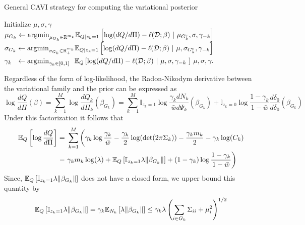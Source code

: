 \documentclass[12pt]{article}
\begin{document}
\begin{algorithm}[htp]
    \caption{General CAVI strategy for computing the variational posterior}
    \label{alg:cavi_gsvb}
    \begin{algorithmic}[0]
	\vspace{.3em}
	\State Initialize $ \mu, \sigma, \gamma $
	\NoDo {} \NoDo
	    \NoDo {}
	    \State $ \mu_{G_k} \leftarrow {\argmin}_{\mu_{G_k} \in \R^{m_k}} \E_{Q | z_k = 1} \left[ \log (dQ/d\Pi) - \ell(\D; \beta) \ | \ \mu_{G_k^c}, \sigma, \gamma_{-k} \right]$
	    \State $ \sigma_{G_k} \leftarrow {{\arg\!\min}}_{\sigma_{G_k} \in \mathbb{R}^{m_k}_+} \mathbb{E}_{Q | z_k = 1} \left[ \log (dQ/d\Pi) - \ell(\mathcal{D}; \beta) \ | \ \mu, \sigma_{G_k^c}, \gamma_{-k} \right]$
	    \State $ \gamma_{k}\ \  \leftarrow {{\arg\!\min}}_{\gamma_{k} \in [0, 1]}\ \ \mathbb{E}_Q \left[ \log (dQ/d\Pi) - \ell(\mathcal{D}; \beta)\  | \ \mu, \sigma, \gamma_{-k} \ \right]$
	    \EndFor
	\EndWhile
	\State \Return $ \mu, \sigma, \gamma $.
    \end{algorithmic}
\end{algorithm}

Regardless of the form of log-likelihood, the Radon-Nikodym derivative between the variational family and the prior can be expressed as
$$
\log \frac{dQ}{d\Pi}(\beta) = \sum_{k=1}^M \log \frac{d Q_k}{d\Pi_k} (\beta_{G_k}) 
= \sum_{k=1}^M \mathbb{I}_{z_k = 1} \log \frac{\gamma_k dN_k}{\bar{w} d \Psi_k}(\beta_{G_k})
+ \mathbb{I}_{z_k = 0} \log \frac{1-\gamma_k}{1 - \bar{w}} \frac{d \delta_0}{d \delta_0} (\beta_{G_k})
$$
Under this factorization it follows that
\begin{equation}
\begin{aligned}
\mathbb{E}_{Q} \left[ \log \frac{d Q}{d \Pi} \right] = &\
    \sum_{k=1}^M 
\bigg(
    \gamma_k \log \frac{\gamma_k}{\bar{w}}
-
    \frac{\gamma_k}{2} \log( \det (2 \pi \Sigma_k))
-
    \frac{\gamma_k m_k}{2}
- 
    \gamma_k \log(C_k) \\
- &\
    \gamma_k m_k \log (\lambda)
+
    \mathbb{E}_Q \left[ \mathbb{I}_{z_k =1} \lambda \| \beta_{G_k} \| \right]
+
    (1-\gamma_k) \log \frac{1 - \gamma_k}{1 - \bar{w}}
\bigg)
\end{aligned}
\end{equation}
Since, $\mathbb{E}_Q \left[ \mathbb{I}_{z_k =1} \lambda \| \beta_{G_k} \| \right]$ does not have a closed form, we upper bound this quantity by
\begin{equation}
    \mathbb{E}_Q \left[ \mathbb{I}_{z_k =1} \lambda \| \beta_{G_k} \| \right] = \gamma_k \mathbb{E}_{N_k} \left[ \lambda \| \beta_{G_k} \| \right] \leq \gamma_k \lambda \left( \sum_{i \in G_k} \Sigma_{ii} + \mu_i^2 \right)^{1/2}
\end{equation}
\end{document}

